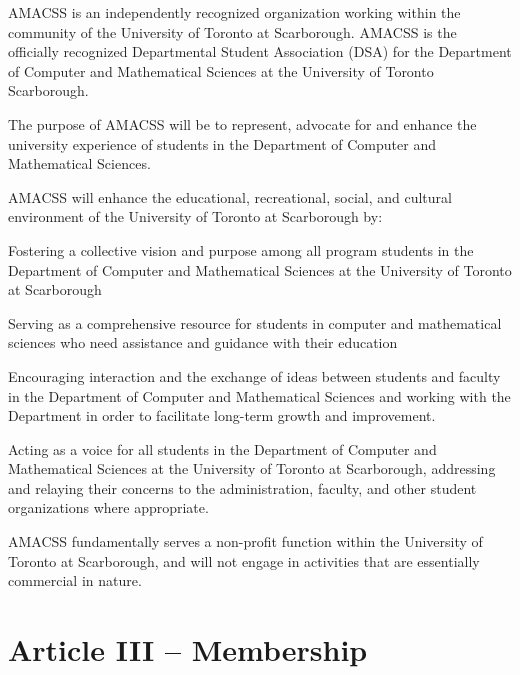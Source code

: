 \documentclass[12pt,a4paper]{article}
\begin{document}
\begin{constitutionlist}
\item AMACSS is an independently recognized organization working within the community of the University of Toronto at Scarborough. AMACSS is the officially recognized Departmental Student Association (DSA) for the Department of Computer and Mathematical Sciences at the University of Toronto Scarborough.

\item The purpose of AMACSS will be to represent, advocate for and enhance the university experience of students in the Department of Computer and Mathematical Sciences.

\item AMACSS will enhance the educational, recreational, social, and cultural environment of the University of Toronto at Scarborough by:

\begin{constitutionlist}
\item Fostering a collective vision and purpose among all program students in the Department of Computer and Mathematical Sciences at the University of Toronto at Scarborough

\item Serving as a comprehensive resource for students in computer and mathematical sciences who need assistance and guidance with their education

\item Encouraging interaction and the exchange of ideas between students and faculty in the Department of Computer and Mathematical Sciences and working with the Department in order to facilitate long-term growth and improvement.

\item Acting as a voice for all students in the Department of Computer and Mathematical Sciences at the University of Toronto at Scarborough, addressing and relaying their concerns to the administration, faculty, and other student organizations where appropriate.
\end{constitutionlist}

\item AMACSS fundamentally serves a non-profit function within the University of Toronto at Scarborough, and will not engage in activities that are essentially commercial in nature.
\end{constitutionlist}

\section{Article III – Membership}
\end{document}

